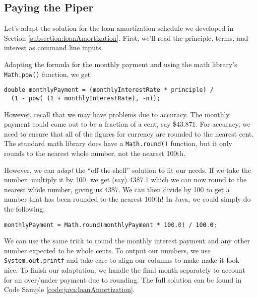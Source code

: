 \subsection{Paying the Piper}

Let's adapt the solution for the loan amortization schedule we developed in 
Section \ref{subsection:loanAmortization}.  First, we'll read the principle, 
terms, and interest as command line inputs.

Adapting the formula for the monthly payment and using the
math library's \texttt{Math.pow()} function, we get

\begin{verbatim}
double monthlyPayment = (monthlyInterestRate * principle) / 
  (1 - pow( (1 + monthlyInterestRate), -n));
\end{verbatim}

However, recall that we may have problems due to accuracy.  The monthly
payment could come out to be a fraction of a cent, say \$43.871.  For 
accuracy, we need to ensure that all of the figures for currency are rounded
to the nearest cent.  The standard math library does have a \texttt{Math.round()}
function, but it only rounds to the nearest whole number, not the nearest
100th.

However, we can \emph{adapt} the ``off-the-shelf'' solution to fit our needs.  
If we take the number, multiply it by 100, we get (say) 4387.1 which we can
now round to the nearest whole number, giving us 4387.  We can then 
divide by 100 to get a number that has been rounded to the nearest 100th!
In Java, we could simply do the following.

\texttt{monthlyPayment = Math.round(monthlyPayment * 100.0) / 100.0;}

We can use the same trick to round the monthly interest payment and any
other number expected to be whole cents.  To output our numbers, we use
\texttt{System.out.printf} and take care to align our columns to make make it look 
nice.  To finish our adaptation, we handle the final month separately to account
for an over/under payment due to rounding.  The full solution can be found
in Code Sample \ref{code:java:loanAmortization}.

